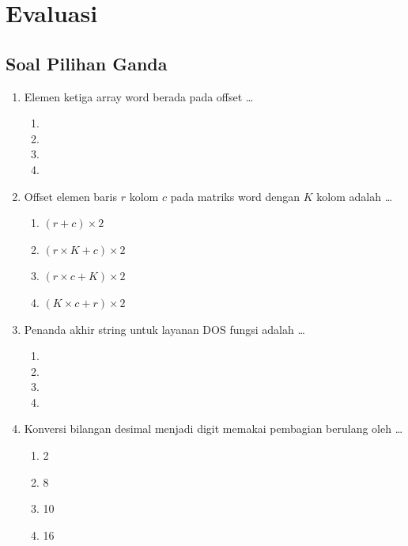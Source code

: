 \section{Evaluasi}
\label{sec:evaluasi-bab15}

\subsection{Soal Pilihan Ganda}

\begin{enumerate}
    \item Elemen ketiga array word  berada pada offset
          \dots
          \begin{enumerate}
              \item {} \item {}
              \item {} \item {}
          \end{enumerate}

    \item Offset elemen baris $r$ kolom $c$ pada matriks word dengan
          $K$ kolom adalah \dots
          \begin{enumerate}
              \item $(r + c) \times 2$
              \item $(r \times K + c) \times 2$
              \item $(r \times c + K) \times 2$
              \item $(K \times c + r) \times 2$
          \end{enumerate}

    \item Penanda akhir string untuk layanan DOS fungsi 
          adalah \dots
          \begin{enumerate}
              \item {} \item {}
              \item {} \item {}
          \end{enumerate}

    \item Konversi bilangan desimal menjadi digit memakai pembagian
          berulang oleh \dots
          \begin{enumerate}
              \item 2 \item 8
              \item 10 \item 16
          \end{enumerate}


\end{enumerate}
